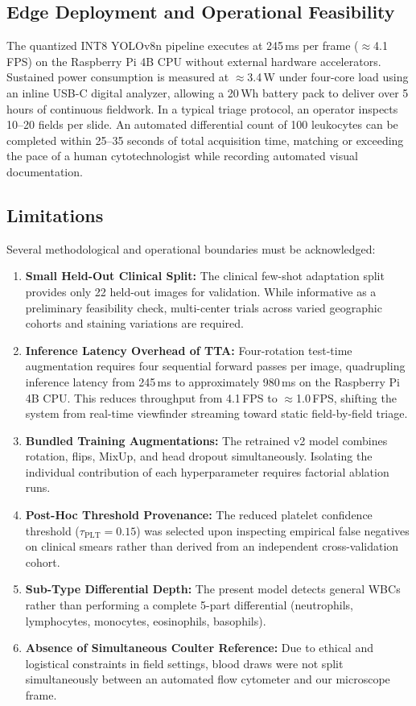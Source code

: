 \documentclass[10pt,conference]{IEEEtran}
\begin{document}
\subsection{Edge Deployment and Operational Feasibility}
The quantized INT8 YOLOv8n pipeline executes at 245\,ms per frame ($\approx$4.1\,FPS) on the Raspberry Pi 4B CPU without external hardware accelerators. Sustained power consumption is measured at $\approx$3.4\,W under four-core load using an inline USB-C digital analyzer, allowing a 20\,Wh battery pack to deliver over 5 hours of continuous fieldwork. In a typical triage protocol, an operator inspects 10–20 fields per slide. An automated differential count of 100 leukocytes can be completed within 25–35 seconds of total acquisition time, matching or exceeding the pace of a human cytotechnologist while recording automated visual documentation.

\subsection{Limitations}
Several methodological and operational boundaries must be acknowledged:
\begin{enumerate}
  \item \textbf{Small Held-Out Clinical Split:} The clinical few-shot adaptation split provides only 22 held-out images for validation. While informative as a preliminary feasibility check, multi-center trials across varied geographic cohorts and staining variations are required.
  \item \textbf{Inference Latency Overhead of TTA:} Four-rotation test-time augmentation requires four sequential forward passes per image, quadrupling inference latency from 245\,ms to approximately 980\,ms on the Raspberry Pi 4B CPU. This reduces throughput from 4.1\,FPS to $\approx$1.0\,FPS, shifting the system from real-time viewfinder streaming toward static field-by-field triage.
  \item \textbf{Bundled Training Augmentations:} The retrained v2 model combines rotation, flips, MixUp, and head dropout simultaneously. Isolating the individual contribution of each hyperparameter requires factorial ablation runs.
  \item \textbf{Post-Hoc Threshold Provenance:} The reduced platelet confidence threshold ($\tau_{\text{PLT}} = 0.15$) was selected upon inspecting empirical false negatives on clinical smears rather than derived from an independent cross-validation cohort.
  \item \textbf{Sub-Type Differential Depth:} The present model detects general WBCs rather than performing a complete 5-part differential (neutrophils, lymphocytes, monocytes, eosinophils, basophils).
  \item \textbf{Absence of Simultaneous Coulter Reference:} Due to ethical and logistical constraints in field settings, blood draws were not split simultaneously between an automated flow cytometer and our microscope frame.
\end{enumerate}
\end{document}
